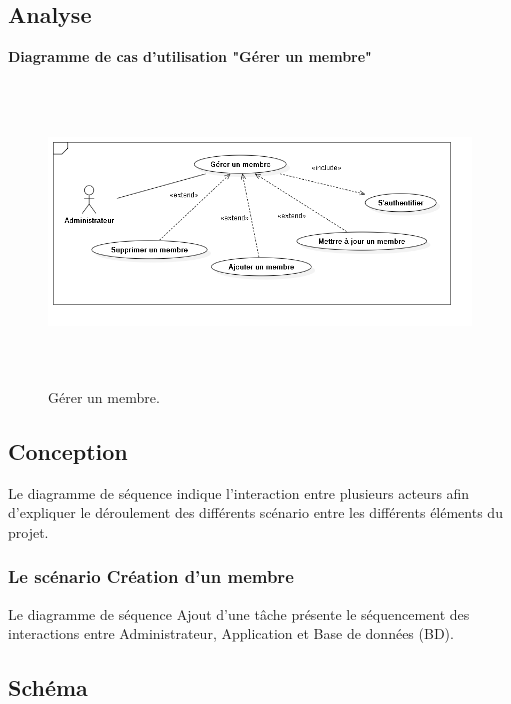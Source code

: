 

\subsection{Analyse}

    \textbf{ Diagramme de cas d'utilisation "G\'{e}rer un membre"}
    \begin{figure}[H]
    \center
    \includegraphics[width=13cm,height=8cm]{./figures/ucM.png}
    \caption{G\'{e}rer un membre.}

    \end{figure}

\subsection{Conception}

Le diagramme de s\'{e}quence indique l'interaction entre plusieurs acteurs
afin d'expliquer le d\'{e}roulement des diff\'{e}rents sc\'{e}nario entre les diff\'{e}rents
\'{e}l\'{e}ments du projet.

\subsubsection{Le sc\'{e}nario \guillemotleft{} Cr\'{e}ation d'un membre \guillemotright{}}

Le diagramme de s\'{e}quence \guillemotleft{} Ajout d'une t\^{a}che \guillemotright{} pr\'{e}sente le s\'{e}quencement
des interactions entre Administrateur, Application et Base de donn\'{e}es (BD).

\newpage
\subsection{Sch\'{e}ma}

